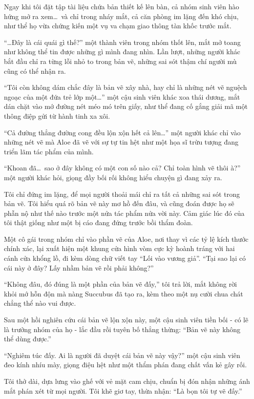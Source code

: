 \documentclass[../main.tex]{subfiles}
\begin{document}
Ngay khi tôi đặt tập tài liệu chứa bản thiết kế lên bàn, cả nhóm sinh viên hào hứng mở ra xem\dots\ và chỉ trong nháy mắt, cả căn phòng im lặng đến khó chịu, như thể họ vừa chứng kiến một vụ va chạm giao thông tàn khốc trước mắt.

``\dots Đây là cái quái gì thế?'' một thành viên trong nhóm thốt lên, mắt mở toang như không thể tin được những gì mình đang nhìn. Lần lượt, những người khác bắt đầu chỉ ra từng lỗi nhỏ to trong bản vẽ, những sai sót thậm chí người mù cũng có thể nhận ra.

``Tôi còn không dám chắc đây là bản vẽ xây nhà, hay chỉ là những nét vẽ nguệch ngoạc của một đứa trẻ lớp một\dots'' một cậu sinh viên khác xoa thái dương, mắt dán chặt vào mớ đường nét méo mó trên giấy, như thể đang cố gắng giải mã một thông điệp gửi từ hành tinh xa xôi.

``Cả đường thẳng đường cong đều lộn xộn hết cả lên\dots'' một người khác chỉ vào những nét vẽ mà Aloe đã vẽ với sự tự tin hệt như một họa sĩ trừu tượng đang triển lãm tác phẩm của mình.

``Khoan đã\dots\ sao ở đây không có một con số nào cả? Chỉ toàn hình vẽ thôi à?'' một người khác hỏi, giọng đầy bối rối không hiểu chuyện gì đang xảy ra.

Tôi chỉ đứng im lặng, để mọi người thoải mái chỉ ra tất cả những sai sót trong bản vẽ. Tôi hiểu quá rõ bản vẽ này mơ hồ đến đâu, và cũng đoán được họ sẽ phẫn nộ như thế nào trước một nửa tác phẩm nửa vời này. Cảm giác lúc đó của tôi thật giống như một bị cáo đang đứng trước bồi thẩm đoàn.

Một cô gái trong nhóm chỉ vào phần vẽ của Aloe, nơi thay vì các tỷ lệ kích thước chính xác, lại xuất hiện một khung cửa hình vòm cực kỳ hoành tráng với hai cánh cửa khổng lồ, đi kèm dòng chữ viết tay ``Lối vào vương giả''. ``Tại sao lại có cái này ở đây? Lấy nhầm bản vẽ rồi phải không?''

``Không đâu, đó đúng là một phần của bản vẽ đấy,'' tôi trả lời, mắt không rời khỏi mớ hỗn độn mà nàng Succubus đã tạo ra, kèm theo một nụ cười chua chát chẳng thể nào vui được.

Sau một hồi nghiên cứu cái bản vẽ lộn xộn này, một cậu sinh viên tiền bối - có lẽ là trưởng nhóm của họ - lắc đầu rồi tuyên bố thẳng thừng: ``Bản vẽ này không thể dùng được.''

``Nghiêm túc đấy. Ai là người đã duyệt cái bản vẽ này vậy?'' một cậu sinh viên đeo kính nhíu mày, giọng điệu hệt như một thẩm phán đang chất vấn kẻ gây rối.

Tôi thở dài, dựa lưng vào ghế với vẻ mặt cam chịu, chuẩn bị đón nhận những ánh mắt phán xét từ mọi người. Tôi khẽ giơ tay, thừa nhận: ``Là bọn tôi tự vẽ đấy.''
\end{document}
